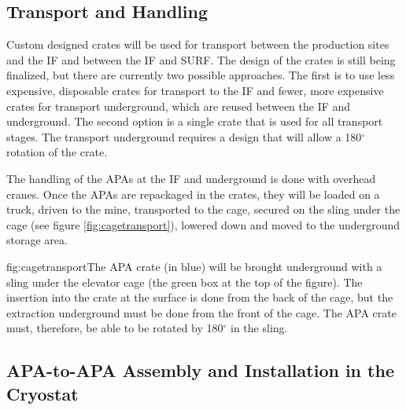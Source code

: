 \subsection{Transport and Handling}
\label{sec:fdsp-apa-install-transport}

Custom designed crates will be used for transport between the production sites and the IF and between the IF and SURF. The design of the crates is still being finalized, but there are currently two possible approaches. The first is to use less expensive, disposable crates for transport to the IF and fewer, more expensive crates for transport underground, which are reused between the IF and underground. The second option is a single crate that is used for all transport stages. The transport underground requires a design that will allow a 180$^{\circ}$ rotation of the crate. 


The handling of the APAs at the IF and underground is done with overhead cranes. Once the APAs are repackaged in the crates, they  will be loaded on a truck, driven to the mine, transported to the cage, secured on the sling under the cage (see figure \ref{fig:cagetransport}), lowered down and moved to the underground storage area.

\begin{dunefigure}{fig:cagetransport}{The APA crate (in blue) will be brought underground with a sling under the elevator cage (the green box at the top of the figure). The insertion into the crate at the surface is done from the back of the cage, but the extraction underground must be done from the front of the cage. The APA crate must, therefore, be able to be rotated  by 180$^\circ$ in the sling.}
\setlength{\fboxsep}{0pt}
\setlength{\fboxrule}{0.5pt}
\end{dunefigure}


\subsection{APA-to-APA Assembly and Installation in the Cryostat}
\label{sec:fdsp-apa-install-cryostat}


